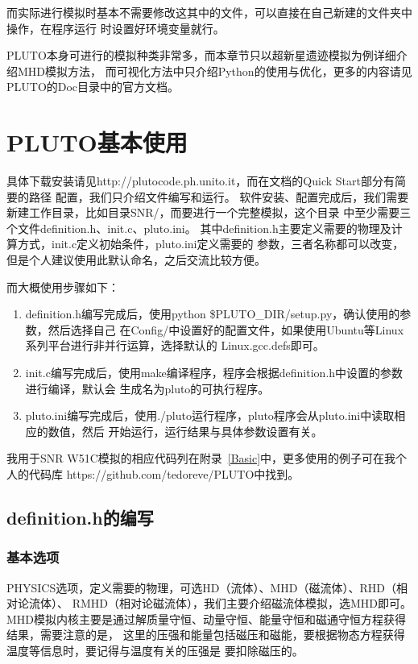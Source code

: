 而实际进行模拟时基本不需要修改这其中的文件，可以直接在自己新建的文件夹中操作，在程序运行
时设置好环境变量就行。

PLUTO本身可进行的模拟种类非常多，而本章节只以超新星遗迹模拟为例详细介绍MHD模拟方法，
而可视化方法中只介绍Python的使用与优化，更多的内容请见PLUTO的Doc目录中的官方文档。

\section{PLUTO基本使用}
\label{PLUTOuse}
具体下载安装请见http://plutocode.ph.unito.it，而在文档的Quick Start部分有简要的路径
配置，我们只介绍文件编写和运行。
软件安装、配置完成后，我们需要新建工作目录，比如目录SNR/，而要进行一个完整模拟，这个目录
中至少需要三个文件definition.h、init.c、pluto.ini。
其中definition.h主要定义需要的物理及计算方式，init.c定义初始条件，pluto.ini定义需要的
参数，三者名称都可以改变，但是个人建议使用此默认命名，之后交流比较方便。

而大概使用步骤如下：
\begin{enumerate}

    \item definition.h编写完成后，使用python \$PLUTO\_DIR/setup.py，确认使用的参数，然后选择自己
    在Config/中设置好的配置文件，如果使用Ubuntu等Linux系列平台进行非并行运算，选择默认的
    Linux.gcc.defs即可。

    \item init.c编写完成后，使用make编译程序，程序会根据definition.h中设置的参数进行编译，默认会
    生成名为pluto的可执行程序。

    \item pluto.ini编写完成后，使用./pluto运行程序，pluto程序会从pluto.ini中读取相应的数值，然后
    开始运行，运行结果与具体参数设置有关。

\end{enumerate}
我用于SNR W51C模拟的相应代码列在附录~\ref{Basic}中，更多使用的例子可在我个人的代码库
https://github.com/tedoreve/PLUTO中找到。

\subsection{definition.h的编写}
\subsubsection{基本选项}

PHYSICS选项，定义需要的物理，可选HD（流体）、MHD（磁流体）、RHD（相对论流体）、
RMHD（相对论磁流体），我们主要介绍磁流体模拟，选MHD即可。
MHD模拟内核主要是通过解质量守恒、动量守恒、能量守恒和磁通守恒方程获得结果，需要注意的是，
这里的压强和能量包括磁压和磁能，要根据物态方程获得温度等信息时，要记得与温度有关的压强是
要扣除磁压的。

